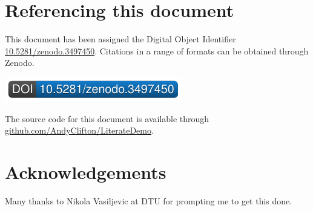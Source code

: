 \documentclass[11pt,]{article}
\begin{document}
\hypertarget{referencing-this-document}{%
\section*{Referencing this document}\label{referencing-this-document}}

This document has been assigned the Digital Object Identifier \href{http://dx.doi.org/10.5281/zenodo.3497450}{10.5281/zenodo.3497450}. Citations in a range of formats can be obtained through Zenodo.

\href{https://doi.org/10.5281/zenodo.3497450}{\includegraphics{DOIBadgeGenerator.pdf}}

The source code for this document is available through \href{https://github.com/AndyClifton/LiterateDemo}{github.com/AndyClifton/LiterateDemo}.

\hypertarget{acknowledgements}{%
\section*{Acknowledgements}\label{acknowledgements}}

Many thanks to Nikola Vasiljevic at DTU for prompting me to get this done.

\renewcommand\refname{Bibliography}

\end{document}
